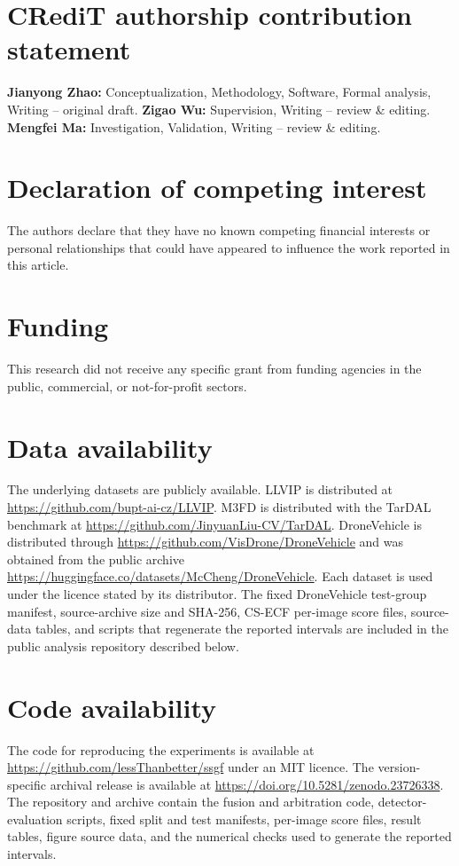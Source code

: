 \documentclass[preprint,11pt]{elsarticle}
\begin{document}
\section*{CRediT authorship contribution statement}

\textbf{Jianyong Zhao:} Conceptualization, Methodology, Software, Formal
analysis, Writing -- original draft. \textbf{Zigao Wu:} Supervision, Writing
-- review \& editing. \textbf{Mengfei Ma:} Investigation, Validation,
Writing -- review \& editing.

\section*{Declaration of competing interest}

The authors declare that they have no known competing financial interests or
personal relationships that could have appeared to influence the work reported
in this article.

\section*{Funding}

This research did not receive any specific grant from funding agencies in the
public, commercial, or not-for-profit sectors.

\section*{Data availability}

The underlying datasets are publicly available. LLVIP is distributed at
\url{https://github.com/bupt-ai-cz/LLVIP}. M3FD is distributed with the TarDAL
benchmark at \url{https://github.com/JinyuanLiu-CV/TarDAL}. DroneVehicle is
distributed through \url{https://github.com/VisDrone/DroneVehicle} and was
obtained from the public archive
\url{https://huggingface.co/datasets/McCheng/DroneVehicle}. Each dataset is used
under the licence stated by its distributor. The fixed DroneVehicle test-group
manifest, source-archive size and SHA-256, CS-ECF per-image score files,
source-data tables, and scripts that regenerate the reported intervals are
included in the public analysis repository described below.

\section*{Code availability}

The code for reproducing the experiments is available at
\url{https://github.com/lessThanbetter/ssgf} under an MIT licence. The
version-specific archival release is available at
\url{https://doi.org/10.5281/zenodo.23726338}. The repository and archive contain
the fusion and arbitration code, detector-evaluation scripts, fixed split and
test manifests, per-image score files, result tables, figure source data, and
the numerical checks used to generate the reported intervals.
\end{document}

